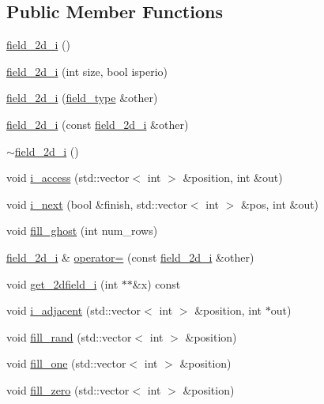 \subsection*{Public Member Functions}
\begin{DoxyCompactItemize}
\item 
\hyperlink{classfield__2d__i_ab7586ee4301dfa3b724cd6c6ffdc78e1}{field\+\_\+2d\+\_\+i} ()
\item 
\hyperlink{classfield__2d__i_a1c2f6c9078f0c91b763ffafefb2760a3}{field\+\_\+2d\+\_\+i} (int size, bool isperio)
\item 
\hyperlink{classfield__2d__i_a441d70c0ae4dba2055f0cbc2430d372e}{field\+\_\+2d\+\_\+i} (\hyperlink{classfield__type}{field\+\_\+type} \&other)
\item 
\hyperlink{classfield__2d__i_a55d2e60260b8e3355ad6e2c54d9b6db7}{field\+\_\+2d\+\_\+i} (const \hyperlink{classfield__2d__i}{field\+\_\+2d\+\_\+i} \&other)
\item 
\hyperlink{classfield__2d__i_a61ec328fb30916e3875a985a378024bb}{$\sim$field\+\_\+2d\+\_\+i} ()
\item 
void \hyperlink{classfield__2d__i_aa25eba50d60662ad21885050503cdba9}{i\+\_\+access} (std\+::vector$<$ int $>$ \&position, int \&out)
\item 
void \hyperlink{classfield__2d__i_a99b396423d5d1490192f557cbd02ec10}{i\+\_\+next} (bool \&finish, std\+::vector$<$ int $>$ \&pos, int \&out)
\item 
void \hyperlink{classfield__2d__i_aa4d7c1c2e6fb75459b0cc009f29293f1}{fill\+\_\+ghost} (int num\+\_\+rows)
\item 
\hyperlink{classfield__2d__i}{field\+\_\+2d\+\_\+i} \& \hyperlink{classfield__2d__i_a513a9ce21440299a77291002a67d52bc}{operator=} (const \hyperlink{classfield__2d__i}{field\+\_\+2d\+\_\+i} \&other)
\item 
void \hyperlink{classfield__2d__i_ab2f4ca5487861e2d566ec12d572d0c05}{get\+\_\+2dfield\+\_\+i} (int $\ast$$\ast$\&x) const 
\item 
void \hyperlink{classfield__2d__i_a576bc6fa317bf75ac5835d2d9ef0b10c}{i\+\_\+adjacent} (std\+::vector$<$ int $>$ \&position, int $\ast$out)
\item 
void \hyperlink{classfield__2d__i_ad0c4a3a9efde2bb4abfb131b3acfb7c2}{fill\+\_\+rand} (std\+::vector$<$ int $>$ \&position)
\item 
void \hyperlink{classfield__2d__i_a859791e738fa2340ac579f4466a67a2f}{fill\+\_\+one} (std\+::vector$<$ int $>$ \&position)
\item 
void \hyperlink{classfield__2d__i_a1049b9c54c259a4a244746bfe8ff300f}{fill\+\_\+zero} (std\+::vector$<$ int $>$ \&position)
$$
\end{DoxyCompactItemize}
